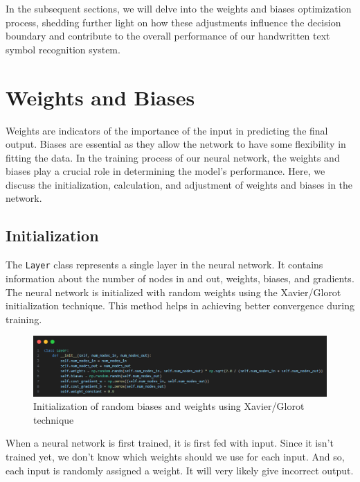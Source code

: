 \documentclass{article}
\begin{document}
In the subsequent sections, we will delve into the weights and biases optimization process, shedding further light on how these adjustments influence the decision boundary and contribute to the overall performance of our handwritten text symbol recognition system.

\newpage
\section{Weights and Biases}
Weights are indicators of the importance of the input in predicting the final output. Biases are essential as they allow the network to have some flexibility in fitting the data. In the training process of our neural network, the weights and biases play a crucial role in determining the model's performance. Here, we discuss the initialization, calculation, and adjustment of weights and biases in the network. 

\subsection{Initialization}
The \texttt{Layer} class represents a single layer in the neural network. It contains information about the number of nodes in and out, weights, biases, and gradients. The neural network is initialized with random weights using the Xavier/Glorot initialization technique. This method helps in achieving better convergence during training.

\begin{figure}[ht]
    \centering 
    \includegraphics[width=1\textwidth]{images/Xavier-Glorot-initialization-for-weights.png}
    \caption{Initialization of random biases and weights using Xavier/Glorot technique}
    \label{fig:initialized_weights}
\end{figure}

When a neural network is first trained, it is first fed with input. Since it isn't trained yet, we don't know which weights should we use for each input. And so, each input is randomly assigned a weight. It will very likely give incorrect output.
\newpage
\end{document}

